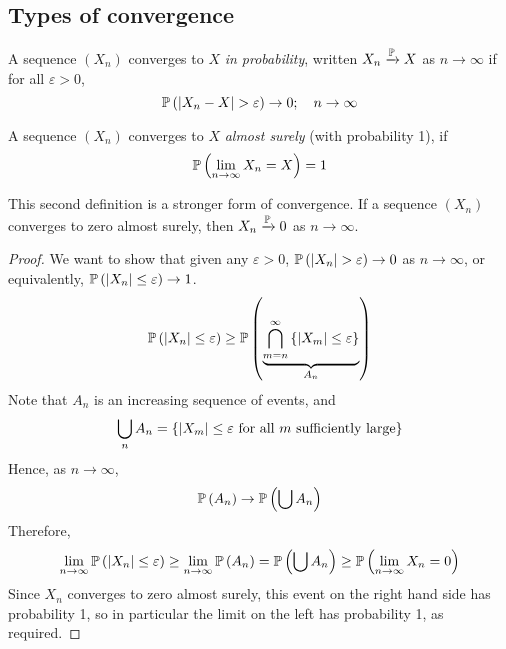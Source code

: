 \subsection{Types of convergence}
\begin{definition}
	A sequence \((X_n)\) converges to \(X\) \textit{in probability}, written \(X_n \xrightarrow{\mathbb{P}} X\) as \(n \to \infty\) if for all \(\varepsilon > 0\),
	\[
		\mathbb{P}\left({\abs{X_n - X} > \varepsilon}\right) \to 0;\quad n \to \infty
	\]
\end{definition}
\begin{definition}
	A sequence \((X_n)\) converges to \(X\) \textit{almost surely} (with probability 1), if
	\[
		\mathbb{P}\left({\lim_{n \to \infty} X_n = X }\right) = 1
	\]
\end{definition}
\noindent This second definition is a stronger form of convergence.
If a sequence \((X_n)\) converges to zero almost surely, then \(X_n \xrightarrow{\mathbb{P}} 0\) as \(n \to \infty\).
\begin{proof}
	We want to show that given any \(\varepsilon > 0\), \(\mathbb{P}\left({\abs{X_n} > \varepsilon}\right) \to 0\) as \(n \to \infty\), or equivalently, \(\mathbb{P}\left({\abs{X_n} \leq \varepsilon}\right) \to 1\).
	\[
		\mathbb{P}\left({\abs{X_n} \leq \varepsilon}\right) \geq \mathbb{P}\left({\underbrace{\bigcap_{m = n}^\infty  \qty{\abs{X_m} \leq \varepsilon}}_{A_n}}\right)
	\]
	Note that \(A_n\) is an increasing sequence of events, and
	\[
		\bigcup_n A_n = \qty{\abs{X_m} \leq \varepsilon \text{ for all } m \text{ sufficiently large}}
	\]
	Hence, as \(n \to \infty\),
	\[
		\mathbb{P}\left({A_n}\right) \to \mathbb{P}\left({\bigcup A_n}\right)
	\]
	Therefore,
	\[
		\lim_{n \to \infty} \mathbb{P}\left({\abs{X_n} \leq \varepsilon}\right) \geq \lim_{n \to \infty} \mathbb{P}\left({A_n}\right) = \mathbb{P}\left({\bigcup A_n}\right) \geq \mathbb{P}\left({\lim_{n \to \infty} X_n = 0}\right)
	\]
	Since \(X_n\) converges to zero almost surely, this event on the right hand side has probability 1, so in particular the limit on the left has probability 1, as required.
\end{proof}

